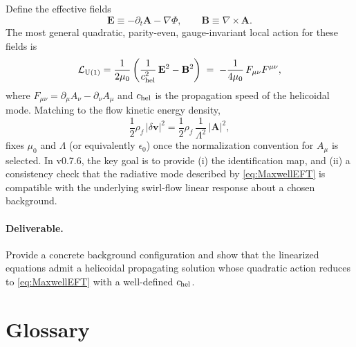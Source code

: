 \documentclass[10pt]{article}
\begin{document}
Define the effective fields
\begin{equation}
\mathbf{E} \equiv -\partial_t \mathbf{A}-\nabla\Phi,
\qquad
\mathbf{B} \equiv \nabla\times\mathbf{A}.
\end{equation}
The most general quadratic, parity-even, gauge-invariant local action for these fields is
\begin{equation}
\mathcal{L}_{\mathrm{U}(1)}=\frac{1}{2\mu_0}\left(\frac{1}{c_{\rm hel}^2}\,\mathbf{E}^2-\mathbf{B}^2\right)
\;=\;-\frac{1}{4\mu_0}\,F_{\mu\nu}F^{\mu\nu},
\label{eq:MaxwellEFT}
\end{equation}
where $F_{\mu\nu}=\partial_\mu A_\nu-\partial_\nu A_\mu$ and $c_{\rm hel}$ is the propagation speed of the helicoidal
mode. Matching to the flow kinetic energy density,
\begin{equation}
\frac{1}{2}\rho_{\!f}\,|\delta\mathbf{v}|^2 = \frac{1}{2}\rho_{\!f}\,\frac{1}{\Lambda^2}\,|\mathbf{A}|^2,
\end{equation}
fixes $\mu_0$ and $\Lambda$ (or equivalently $\epsilon_0$) once the normalization convention for $A_\mu$ is selected.
In v0.7.6, the key goal is to provide (i) the identification map, and (ii) a consistency check that the radiative mode
described by \eqref{eq:MaxwellEFT} is compatible with the underlying swirl-flow linear response about a chosen background.

\paragraph{Deliverable.}
Provide a concrete background configuration and show that the linearized equations admit a helicoidal propagating solution
whose quadratic action reduces to \eqref{eq:MaxwellEFT} with a well-defined $c_{\rm hel}$.


\section{Glossary}
\label{sec:v076-glossary}
\end{document}
